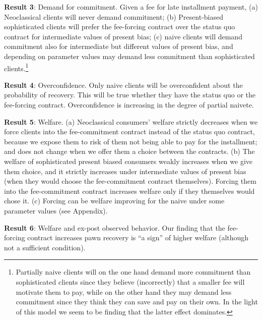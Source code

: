 \documentclass[oneside,11pt]{article}
\begin{document}
\vspace{.1in}
\noindent \textbf{Result 3}: Demand for commitment. Given a fee for late installment payment, (a) Neoclassical clients will never demand commitment; (b) Present-biased sophisticated clients will prefer the fee-forcing contract over the status quo contract for intermediate values of present bias; (c) naive clients will demand commitment also for intermediate but different values of present bias, and depending on parameter values may demand less commitment than sophisticated clients.\footnote{Partially naive clients will on the one hand demand more commitment than sophisticated clients since they believe (incorrectly) that a smaller fee will motivate them to pay, while on the other hand they may demand less commitment since they think they can save and pay on their own. In the light of this model we seem to be finding that the latter effect dominates. %
}

\vspace{.1in}
\noindent \textbf{Result 4}: Overconfidence. Only naive clients will be overconfident about the probability of recovery. This will be true whether they have the status quo or the fee-forcing contract. Overconfidence is increasing in the degree of partial naivete.

\vspace{.1in}
\noindent \textbf{Result 5}: Welfare. (a) Neoclassical consumers' welfare strictly decreases when we force clients into the fee-commitment contract instead of the status quo contract, because we expose them to risk of them not being able to pay for the installment; and does not change when we offer them a choice between the contracts. (b) The welfare of sophisticated present biased consumers weakly increases when we give them choice, and it strictly increases  under intermediate values of present bias (when they would choose the fee-commitment contract themselves). Forcing them into the fee-commitment contract increases welfare only if they themselves would chose it. (c) Forcing can be welfare improving for the naive under some parameter values (see Appendix). 

\vspace{.1in}
\noindent \textbf{Result 6}: Welfare and ex-post observed behavior. Our finding that the fee-forcing contract increases pawn recovery is ``a sign'' of higher welfare (although not a sufficient condition).
\end{document}
